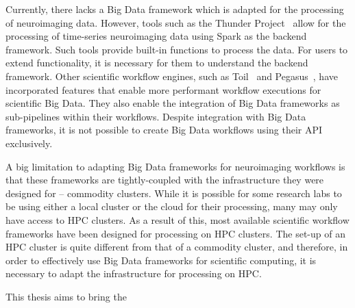         Currently, there lacks a Big Data framework which is adapted for the
        processing of neuroimaging data. However, tools such as the Thunder 
        Project~\cite{Freeman:2014aa} allow for the processing of time-series
        neuroimaging data using Spark as the backend framework. Such tools
        provide built-in functions to process the data. For users to 
        extend functionality, it is necessary for them to understand the 
        backend framework. Other scientific workflow engines, such as 
        Toil~\cite{Vivian:2017aa} and Pegasus~\cite{DEELMAN201517}, have 
        incorporated features that enable more 
        performant workflow executions for scientific Big Data. They also enable
        the integration of Big Data frameworks as sub-pipelines within their 
        workflows. Despite integration with Big Data frameworks, it is not
        possible to create Big Data workflows using their API exclusively.

        A big limitation to adapting Big Data frameworks for neuroimaging 
        workflows is that these frameworks are tightly-coupled with the 
        infrastructure they were designed for -- commodity clusters. While
        it is possible for some research labs to be using either a local cluster
        or the cloud for their processing, many may only have access to HPC
        clusters. As a result of this, most available scientific workflow 
        frameworks have been designed for processing on HPC clusters. The 
        set-up of an HPC cluster is quite different from that of a commodity 
        cluster, and therefore, in order to effectively use Big Data frameworks
        for scientific computing, it is necessary to adapt the infrastructure 
        for processing on HPC.


	This thesis aims to bring the 


